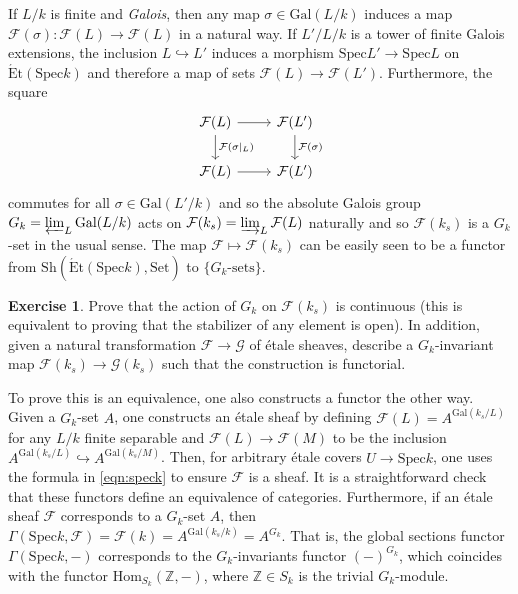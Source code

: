 \documentclass{article}
\newcommand{\Hom}{\mathrm{Hom}}
\newcommand{\Spec}{\mathrm{Spec}}
\newcommand{\Gal}{\mathrm{Gal}}
\newcommand{\Set}{\mathrm{Set}}
\newcommand{\Et}{\acute{\mathrm{E}}\mathrm{t}}
\newcommand{\Sh}{\mathrm{Sh}}
\newcommand{\Z}{\mathbb{Z}}
\theoremstyle{plain}
\theoremstyle{definition}
\newtheorem*{exercise}{Exercise}
\begin{document}
    If $L/k$ is finite and \textit{Galois}, then any map $\sigma\in\Gal(L/k)$ induces a map $\mathcal{F} (\sigma):\mathcal{F} (L)\to\mathcal{F} (L)$ in a natural way. If $L'/L/k$ is a tower of finite Galois extensions, the inclusion $L\hookrightarrow L'$ induces a morphism $\Spec L'\to\Spec L$ on $\Et(\Spec k)$ and therefore a map of sets $\mathcal{F} (L)\to\mathcal{F} (L')$. Furthermore, the square 
    \[
        \begin{tikzcd}
            \mathcal{F} (L) \arrow[r,""] \arrow[d,"\mathcal{F} (\sigma|_L)"] & \mathcal{F} (L') \arrow[d,"\mathcal{F} (\sigma)"] \\
            \mathcal{F} (L) \arrow[r,""] & \mathcal{F} (L')
        \end{tikzcd}
    \]
    commutes for all $\sigma\in\Gal(L'/k)$ and so the absolute Galois group $G_k=\varprojlim_{L}\Gal(L/k)$ acts on $\mathcal{F} (k_s)=\varinjlim_{L}\mathcal{F} (L)$ naturally and so $\mathcal{F} (k_s)$ is a $G_k$-set in the usual sense. The map $\mathcal{F} \mapsto\mathcal{F} (k_s)$ can be easily seen to be a functor from $\Sh(\Et(\Spec k),\Set)$ to $\{G_k\text{-sets}\}$.
    \begin{exercise}
        Prove that the action of $G_k$ on $\mathcal{F} (k_s)$ is continuous (this is equivalent to proving that the stabilizer of any element is open). In addition, given a natural transformation $\mathcal{F} \to\mathcal{G}$ of \'{e}tale sheaves, describe a $G_k$-invariant map $\mathcal{F} (k_s)\to\mathcal{G}(k_s)$ such that the construction is functorial.
    \end{exercise}

    To prove this is an equivalence, one also constructs a functor the other way. Given a $G_k$-set $A$, one constructs an \'{e}tale sheaf by defining $\mathcal{F} (L)=A^{\Gal(k_s/L)}$ for any $L/k$ finite separable and $\mathcal{F} (L)\to\mathcal{F} (M)$ to be the inclusion $A^{\Gal(k_s/L)}\hookrightarrow A^{\Gal(k_s/M)}$. Then, for arbitrary \'{e}tale covers $U\to\Spec k$, one uses the formula in \eqref{eqn:speck} to ensure $\mathcal{F} $ is a sheaf. 
    It is a straightforward check that these functors define an equivalence of categories. 
    Furthermore, if an \'{e}tale sheaf $\mathcal{F} $ corresponds to a $G_k$-set $A$, then $\Gamma(\Spec k,\mathcal{F} )=\mathcal{F} (k)=A^{\Gal(k_s/k)}=A^{G_k}$. 
    That is, the global sections functor $\Gamma(\Spec k,-)$ corresponds to the $G_k$-invariants functor $(-)^{G_k}$, which coincides with the functor $\Hom_{S_k}(\Z,-)$, where $\Z\in S_k$ is the trivial $G_k$-module.
\end{document}
